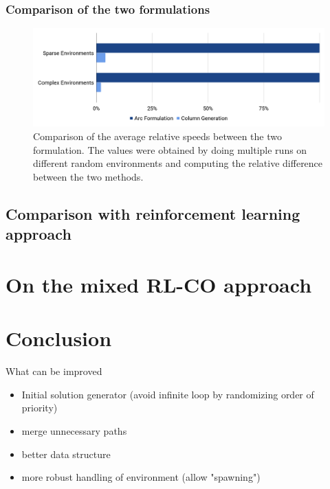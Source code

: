 \documentclass[14pt,a4paper]{article}
\theoremstyle{definition}
\numberwithin{equation}{subsection}
\begin{document}
\subsubsection{Comparison of the two formulations}
\begin{figure}[h]
	\centering
	\includegraphics[width=\linewidth]{img/comparison.png}
	\caption{Comparison of the average relative speeds between the two formulation. The values were obtained by doing multiple runs on different random environments and computing the relative difference between the two methods.}
	\label{fig:comparison}
\end{figure}


\subsection{Comparison with reinforcement learning approach}


\newpage
\section{On the mixed RL-CO approach}




\newpage

\section{Conclusion}
What can be improved
\begin{itemize}
	\item Initial solution generator (avoid infinite loop by randomizing order of priority)
	\item merge unnecessary paths
	\item better data structure 
	\item more robust handling of environment (allow "spawning")
\end{itemize}
\end{document}
